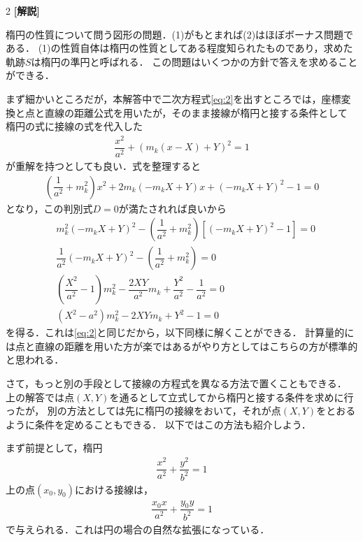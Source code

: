 \documentclass[../../main.tex]{subfiles}
\begin{document}
\begin{multicols}{2}
  {\bf [解説]}

  楕円の性質について問う図形の問題．(1)がもとまれば(2)はほぼボーナス問題である．
  (1)の性質自体は楕円の性質としてある程度知られたものであり，求めた軌跡$S$は楕円の準円と呼ばれる．
  この問題はいくつかの方針で答えを求めることができる．

  まず細かいところだが，本解答中で二次方程式\cref{eq:2}を出すところでは，座標変換と点と直線の距離公式を用いたが，そのまま接線が楕円と接する条件として
  楕円の式に接線の式を代入した
  \begin{align}
    \dfrac{x^2}{a^2}+\left(m_k(x-X)+Y\right)^2 = 1
  \end{align}
  が重解を持つとしても良い．式を整理すると
  \begin{align}
    \left(\dfrac{1}{a^2}+m_k^2\right)x^2 + 2m_k\left(-m_kX+Y\right)x +\left(-m_kX+Y\right)^2 -1 = 0
  \end{align}
  となり，この判別式$D=0$が満たされれば良いから
  \begin{align}
    & m_k^2\left(-m_kX+Y\right)^2 - \left(\dfrac{1}{a^2}+m_k^2\right)\left[\left(-m_kX+Y\right)^2 -1\right] = 0 \\
    & \dfrac{1}{a^2}\left(-m_kX+Y\right)^2 -\left(\dfrac{1}{a^2}+m_k^2\right) = 0                                \\
    & \left(\dfrac{X^2}{a^2}-1\right)m_k^2 - \dfrac{2XY}{a^2}m_k + \dfrac{Y^2}{a^2} -\dfrac{1}{a^2} = 0                        \\
    & \left(X^2-a^2\right)m_k^2 - 2XYm_k + Y^2 - 1= 0
  \end{align}
  を得る．これは\cref{eq:2}と同じだから，以下同様に解くことができる．
  計算量的には点と直線の距離を用いた方が楽ではあるがやり方としてはこちらの方が標準的と思われる．

  さて，もっと別の手段として接線の方程式を異なる方法で置くこともできる．
  上の解答では点$(X,Y)$を通るとして立式してから楕円と接する条件を求めに行ったが，
  別の方法としては先に楕円の接線をおいて，それが点$(X,Y)$をとおるように条件を定めることもできる．
  以下ではこの方法も紹介しよう．

  まず前提として，楕円
  \begin{align}
    \dfrac{x^2}{a^2}+\dfrac{y^2}{b^2} = 1
  \end{align}
  上の点$(x_0,y_0)$における接線は，
  \begin{align}
    \dfrac{x_0 x}{a^2}+\dfrac{y_0 y}{b^2} = 1
  \end{align}
  で与えられる．これは円の場合の自然な拡張になっている．


\end{multicols}
\end{document}
